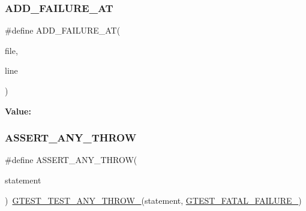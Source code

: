 \mbox{\label{_obj__test_2lib_2googletest-release-1_88_81_2googletest_2include_2gtest_2gtest_8h_a448d7e5105b640e892fd8153fbee0b7f}} 
\subsubsection{\texorpdfstring{ADD\_FAILURE\_AT}{ADD\_FAILURE\_AT}}
{\footnotesize\ttfamily \#define A\+D\+D\+\_\+\+F\+A\+I\+L\+U\+R\+E\+\_\+\+AT(\begin{DoxyParamCaption}\item[{}]{file,  }\item[{}]{line }\end{DoxyParamCaption})}

{\bfseries Value\+:}
\begin{DoxyCode}{0}

\end{DoxyCode}
\mbox{\label{_obj__test_2lib_2googletest-release-1_88_81_2googletest_2include_2gtest_2gtest_8h_affadeef9379fe5aabf6f28d9eab9d3c0}} 
\subsubsection{\texorpdfstring{ASSERT\_ANY\_THROW}{ASSERT\_ANY\_THROW}}
{\footnotesize\ttfamily \#define A\+S\+S\+E\+R\+T\+\_\+\+A\+N\+Y\+\_\+\+T\+H\+R\+OW(\begin{DoxyParamCaption}\item[{}]{statement }\end{DoxyParamCaption})~\mbox{\hyperlink{_obj__test_2lib_2googletest-release-1_88_81_2googletest_2include_2gtest_2internal_2gtest-internal_8h_af48bbd26d54d4afc5e4cef39b1c76ba3}{G\+T\+E\+S\+T\+\_\+\+T\+E\+S\+T\+\_\+\+A\+N\+Y\+\_\+\+T\+H\+R\+O\+W\+\_\+}}(statement, \mbox{\hyperlink{_obj__test_2lib_2googletest-release-1_88_81_2googletest_2include_2gtest_2internal_2gtest-internal_8h_a0f9a4c3ea82cc7bf4478eaffdc168358}{G\+T\+E\+S\+T\+\_\+\+F\+A\+T\+A\+L\+\_\+\+F\+A\+I\+L\+U\+R\+E\+\_\+}})}


